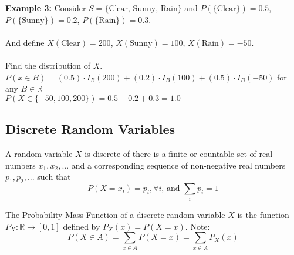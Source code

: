 \documentclass[12pt, twoside]{article}
\begin{document}
\textbf{Example 3:} Consider $S = \{ \text{Clear, Sunny, Rain} \}$ and $P(\{ \text{Clear} \}) = 0.5$, $P(\{ \text{Sunny} \}) = 0.2$, $P(\{ \text{Rain} \}) = 0.3$.\\
\\
And define $X(\text{Clear}) = 200$, $X(\text{Sunny}) = 100$, $X(\text{Rain}) = -50$.\\
\\
Find the distribution of $X$.\\
$P(x \in B) = (0.5) \cdot I_B (200) + (0.2) \cdot I_B (100) + (0.5) \cdot I_B (-50)$ for any $B \in \mathbb{R}$\\
$P(X \in \{ -50, 100, 200 \}) = 0.5 + 0.2 + 0.3 = 1.0$

\subsection{Discrete Random Variables}

\begin{tcolorbox}[title=Definition: Discrete Random Variables]
	A random variable $X$ is discrete of there is a finite or countable set of real numbers $x_1, x_2, ...$ and a corresponding sequence of non-negative real numbers $p_1, p_2, ...$ such that
	$$P(X = x_i) = p_i, \forall i\text{, and } \sum_{i} p_i = 1$$
\end{tcolorbox}

\begin{tcolorbox}[title=Probability Mass Function]
	The Probability Mass Function of a discrete random variable $X$ is the function $P_X : \mathbb{R} \rightarrow [ 0,1 ]$ defined by $P_X (x) = P(X = x)$. Note: $$P(X \in A) = \sum_{x \in A} P(X = x) = \sum_{x \in A} P_X (x)$$
\end{tcolorbox}
\end{document}
